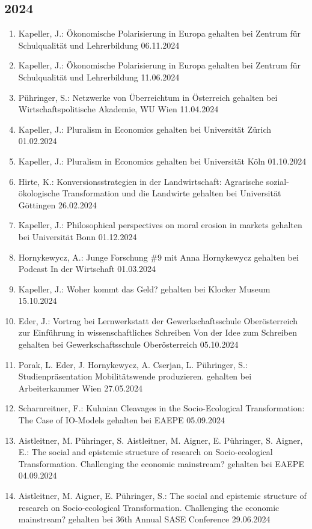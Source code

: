 \subsection*{2024}
\begin{enumerate}
	\item Kapeller, J.: Ökonomische Polarisierung in Europa gehalten bei Zentrum für Schulqualität und Lehrerbildung 06.11.2024
	\item Kapeller, J.: Ökonomische Polarisierung in Europa gehalten bei Zentrum für Schulqualität und Lehrerbildung 11.06.2024
	\item Pühringer, S.: Netzwerke von Überreichtum in Österreich gehalten bei Wirtschaftspolitische Akademie, WU Wien 11.04.2024
	\item Kapeller, J.: Pluralism in Economics gehalten bei Universität Zürich 01.02.2024
	\item Kapeller, J.: Pluralism in Economics gehalten bei Universität Köln 01.10.2024
	\item Hirte, K.: Konversionsstrategien in der Landwirtschaft: Agrarische sozial-ökologische Transformation und die Landwirte gehalten bei Universität Göttingen 26.02.2024
	\item Kapeller, J.: Philosophical perspectives on moral erosion in markets gehalten bei Universität Bonn 01.12.2024
	\item Hornykewycz, A.: Junge Forschung \#9 mit Anna Hornykewycz gehalten bei Podcast \glqq In der Wirtschaft\grqq{} 01.03.2024
	\item Kapeller, J.: Woher kommt das Geld? gehalten bei Klocker Museum 15.10.2024
	\item Eder, J.: Vortrag bei Lernwerkstatt der Gewerkschaftsschule Oberösterreich zur Einführung in wissenschaftliches Schreiben \glqq Von der Idee zum Schreiben\grqq{} gehalten bei Gewerkschaftsschule Oberösterreich 05.10.2024
	\item Porak, L. Eder, J. Hornykewycz, A. Cserjan, L. Pühringer, S.: Studienpräsentation \glqq Mobilitätswende produzieren\grqq{}. gehalten bei Arbeiterkammer Wien 27.05.2024
	\item Scharnreitner, F.: Kuhnian Cleavages in the Socio-Ecological Transformation: The Case of IO-Models gehalten bei EAEPE 05.09.2024
	\item Aistleitner, M.  Pühringer, S. Aistleitner, M. Aigner, E. Pühringer, S.  Aigner, E.: The social and epistemic structure of research on Socio-ecological Transformation. Challenging the economic mainstream? gehalten bei EAEPE 04.09.2024
	\item Aistleitner, M. Aigner, E. Pühringer, S.: The social and epistemic structure of research on Socio-ecological Transformation. Challenging the economic mainstream? gehalten bei 36th Annual SASE Conference 29.06.2024

\end{enumerate}

